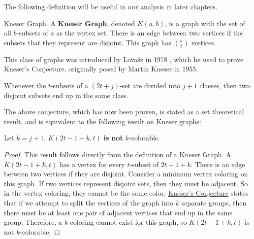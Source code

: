 The following definition will be useful in our analysis in later chapters.

\begin{definition}{Kneser Graph.}
    \label{defn:kneser-graph}
    A \textbf{Kneser Graph}, denoted $K(a,b)$, is a graph with the set of all $b$-subsets of $a$ as the vertex set. There is an edge between two vertices if the subsets that they represent are disjoint. This graph has $\binom{a}{b}$ vertices.  
\end{definition}

This class of graphs was introduced by Lova\'{s}z in 1978 \cite{lovasz_knesers_1978}, which he used to prove Kneser's Conjecture, originally posed by Martin Kneser in 1955.

\begin{kneserconjecture}
    \label{thm:kneser-conjecture}
    Whenever the $t$-subsets of a $(2t+j)$-set are divided into $j+1$ classes, then two disjoint subsets end up in the same class. 
\end{kneserconjecture}

The above conjecture, which has now been proven, is stated as a set theoretical result, and is equivalent to the following result on Kneser graphs:

\begin{corollary}
    \label{cor:no}
    Let $k=j+1$. $K(2t-1+k,t)$ \textbf{is not} $k$-colorable.
\end{corollary}

\begin{proof}
     This result follows directly from the definition of a Kneser Graph. A $K(2t-1+k,t)$ has a vertex for every $t$-subset of $2t-1+k$. There is an edge between two vertices if they are disjoint. Consider a minimum vertex coloring on this graph. If two vertices represent disjoint sets, then they must be adjacent. So in the vertex coloring, they cannot be the same color. \hyperref[thm:kneser-conjecture]{Kneser's Conjecture}  states that if we attempt to split the vertices of the graph into $k$ separate groups, then there must be at least one pair of adjacent vertices that end up in the same group. Therefore, a $k$-coloring cannot exist for this graph, so $K(2t-1+k,t)$ is not $k$-colorable.
\end{proof}